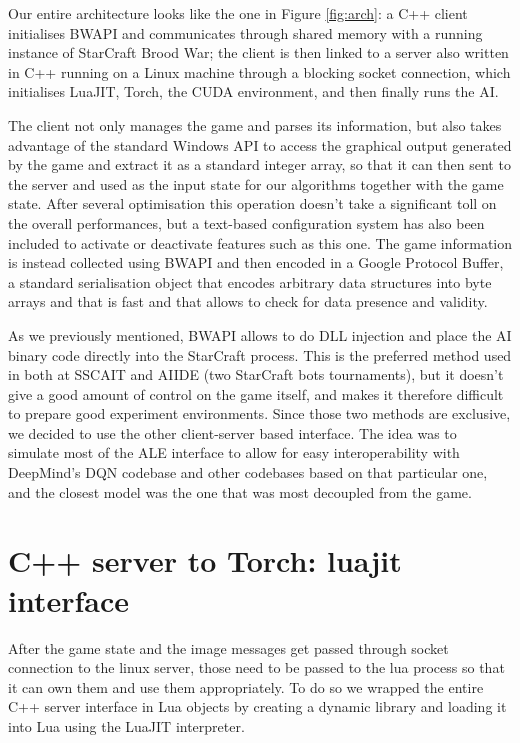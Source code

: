 \documentclass[bsc,frontabs,twoside,singlespacing,parskip,deptreport]{infthesis}     %
\begin{document}
Our entire architecture looks like the one in Figure \ref{fig:arch}: a C++
client initialises BWAPI and communicates through shared memory with a running
instance of StarCraft Brood War; the client is then linked to a server also
written in C++ running on a Linux machine through a blocking socket connection,
which initialises LuaJIT\cite{pall2008luajit}, Torch\cite{collobert2011torch},
the CUDA environment\cite{nvidia2008programming}, and then finally runs the AI.

The client not only manages the game and parses its information, but also takes
advantage of the standard Windows API to access the graphical output generated
by the game and extract it as a standard integer array, so that it can then sent
to the server and used as the input state for our algorithms together with the
game state. After several optimisation this operation doesn't take a significant
toll on the overall performances, but a text-based configuration system has also
been included to activate or deactivate features such as this one. The game
information is instead collected using BWAPI and then encoded in a Google
Protocol Buffer\cite{protobuf}, a standard serialisation object that encodes
arbitrary data structures into byte arrays and that is fast and that allows to
check for data presence and validity.

As we previously mentioned, BWAPI allows to do DLL injection and place the AI
binary code directly into the StarCraft process. This is the preferred method
used in both at SSCAIT and AIIDE (two StarCraft bots tournaments), but it
doesn't give a good amount of control on the game itself, and makes it therefore
difficult to prepare good experiment environments. Since those two methods are
exclusive, we decided to use the other client-server based interface. The idea
was to simulate most of the ALE interface to allow for easy interoperability
with DeepMind's DQN codebase and other codebases based on that particular one,
and the closest model was the one that was most decoupled from the game.

\section{C++ server to Torch: luajit interface}

After the game state and the image messages get passed through socket connection
to the linux server, those need to be passed to the lua process so that it can
own them and use them appropriately. To do so we wrapped the entire C++ server
interface in Lua objects by creating a dynamic library and loading it into Lua
using the LuaJIT interpreter.
\end{document}
